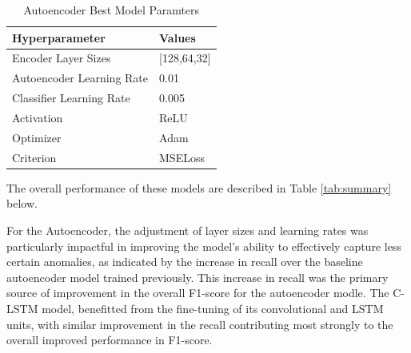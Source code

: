 \documentclass[10pt,twocolumn,letterpaper]{article}
\begin{document}
\begin{table}[h]
   \centering
   \caption{Autoencoder Best Model Paramters}
   \label{tab:autoenc-optimal-params}
   \begin{tabular}{|l|l|}
   \hline
   \textbf{Hyperparameter}               & \textbf{Values}                                 \\ \hline
   Encoder Layer Sizes                   & \small{[128,64,32]}       \\ \hline
   Autoencoder Learning Rate           & 0.01                           \\ \hline
   Classifier Learning Rate            & 0.005                            \\ \hline
   Activation                            & ReLU                                 \\ \hline
   Optimizer                             & Adam                                            \\ \hline
   Criterion                             & MSELoss                                         \\ \hline
   \end{tabular}
   \end{table}

The overall performance of these models are described in Table \ref{tab:summary} below.

\begin{table}[htbp]
   \centering
   \caption{Model Performance Summary}
   \label{tab:summary}
   \end{table}

For the Autoencoder, the adjustment of layer sizes and learning rates was particularly impactful in improving the model's ability to effectively capture less certain anomalies, as indicated by the 
increase in recall over the baseline autoencoder model trained previously. This increase in recall was the primary source of improvement in the overall F1-score for the autoencoder modle. 
The C-LSTM model, benefitted from the fine-tuning of its convolutional and LSTM units, with similar improvement in the recall contributing most strongly to the overall improved performance in F1-score.
\end{document}
